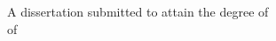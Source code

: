 \begin{titlepage}
    \begin{center}
        \large

        \hfill

        \vfill

        \begingroup
            \spacedallcaps{\myTitle}
        \endgroup

        \vfill

        \begingroup
            A dissertation submitted to attain the degree of\\
            \vspace{0.5em}
            of
        \endgroup

%

        \vfill

%

        \myTime%

        \vfill
    \end{center}
\end{titlepage}
